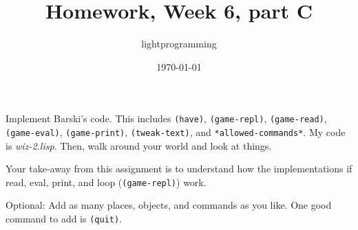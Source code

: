 \documentclass{article}
\title{Homework, Week 6, part C}
\author{lightprogramming}
\date{\today}
\begin{document}
\maketitle{}

Implement Barski's code. This includes \texttt{(have)}, \texttt{(game-repl)}, \texttt{(game-read)}, \texttt{(game-eval)}, \texttt{(game-print)}, \texttt{(tweak-text)}, and \texttt{*allowed-commands*}. My code is \textit{wiz-2.lisp}. Then, walk around your world and look at things.

Your take-away from this assignment is to understand how the implementations if read, eval, print, and loop (\texttt{(game-repl)}) work.

Optional: Add as many places, objects, and commands as you like. One good command to add is \texttt{(quit)}.

%
%
%
\end{document}
